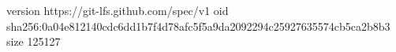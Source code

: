 version https://git-lfs.github.com/spec/v1
oid sha256:0a04e812140cdc6dd1b7f4d78afc5f5a9da2092294c25927635574cb5ca2b8b3
size 125127
